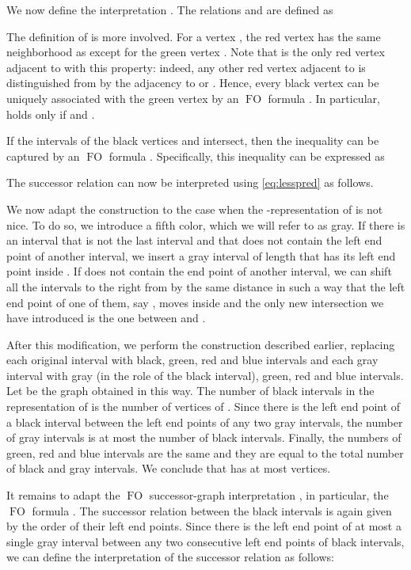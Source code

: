 \documentclass{CSML}
\newcommand{\FO}{\ensuremath{\operatorname{FO}}\xspace}
\theoremstyle{plain}\newtheorem{claim}[thm]{Claim}
\begin{document}
We now define the interpretation .
The relations  and  are defined as

The definition of  is more involved.
For a vertex , the red vertex  has the same neighborhood as  except for the green vertex .
Note that  is the only red vertex adjacent to  with this property: indeed,
any other red vertex  adjacent to  is distinguished from  by the adjacency to  or .
Hence, every black vertex  can be uniquely associated with the green vertex  by an \FO formula .
In particular,  holds only if  and .

If the intervals of the black vertices  and  intersect,
then the inequality  can be captured by an \FO formula .
Specifically, this inequality can be expressed as

The successor relation can now be interpreted using \eqref{eq:lesspred} as follows.


We now adapt the construction to the case when the -representation of  is not nice.
To do so, we introduce a fifth color, which we will refer to as gray.
If there is an interval  that is not the last interval and that does not contain the left end point of another interval,
we insert a gray interval  of length  that has its left end point inside .
If  does not contain the end point of another interval,
we can shift all the intervals to the right from  by the same distance in such a way that
the left end point of one of them, say , moves inside  and
the only new intersection we have introduced is the one between  and .

After this modification, we perform the construction described earlier,
replacing each original interval with black, green, red and blue intervals and
each gray interval with gray (in the role of the black interval), green, red and blue intervals.
Let  be the graph obtained in this way.
The number of black intervals in the representation of  is the number of vertices of .
Since there is the left end point of a black interval between the left end points of any two gray intervals,
the number of gray intervals is at most the number of black intervals.
Finally, the numbers of green, red and blue intervals are the same and
they are equal to the total number of black and gray intervals.
We conclude that  has at most  vertices.

It remains to adapt the \FO successor-graph interpretation ,
in particular, the \FO formula .
The successor relation between the black intervals is again given by the order of their left end points.
Since there is the left end point of at most a single gray interval between any two consecutive left end points of black intervals,
we can define the interpretation of the successor relation as follows:
\end{document}
